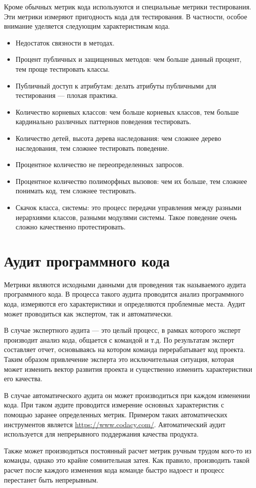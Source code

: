 \documentclass{../../text-style}
\begin{document}
Кроме обычных метрик кода используются и специальные метрики тестирования. Эти метрики измеряют пригодность кода для тестирования. В частности, особое внимание уделяется следующим характеристикам кода.

\begin{itemize}
    \item Недостаток связности в методах.
    \item Процент публичных и защищенных методов: чем больше данный процент, тем проще тестировать классы.
    \item Публичный доступ к атрибутам: делать атрибуты публичными для тестирования --- плохая практика.
    \item Количество корневых классов: чем больше корневых классов, тем больше кардинально различных паттернов поведения тестировать.
    \item Количество детей, высота дерева наследования: чем сложнее дерево наследования, тем сложнее тестировать поведение.
    \item Процентное количество не переопределенных запросов. 
    \item Процентное количество полиморфных вызовов: чем их больше, тем сложнее понимать код, тем сложнее тестировать.
    \item Скачок класса, системы: это процесс передачи управления между разными иерархиями классов, разными модулями системы. Такое поведение очень сложно качественно протестировать.
\end{itemize}

\section{Аудит программного кода}

Метрики являются исходными данными для проведения так называемого аудита программного кода. В процесса такого аудита проводится анализ программного кода, измеряются его характеристики и определяются проблемные места. Аудит может проводиться как экспертом, так и автоматически.

В случае экспертного аудита --- это целый процесс, в рамках которого эксперт производит анализ кода, общается с командой и т.д. По результатам эксперт составляет отчет, основываясь на котором команда перерабатывает код проекта. Таким образом привлечение эксперта это исключительная ситуация, которая может изменить вектор развития проекта и существенно изменить характеристики его качества.

В случае автоматического аудита он может производиться при каждом изменении кода. При таком аудите проводится измерение основных характеристик с помощью заранее определенных метрик. Примером таких автоматических инструментов является \url{https://www.codacy.com/}. Автоматический аудит используется для непрерывного поддержания качества продукта.

Также может производиться постоянный расчет метрик ручным трудом кого-то из команды, однако это крайне сомнительная затея. Как правило, производить такой расчет после каждого изменения кода команде быстро надоест и процесс перестанет быть непрерывным.
\end{document}

